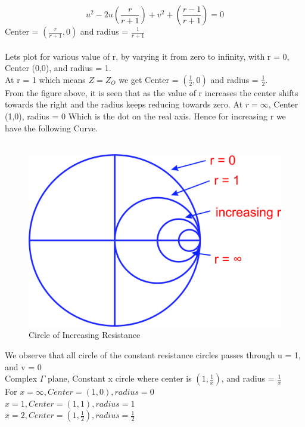 \begin{equation*}
u^2 - 2u\left(\frac{r}{r + 1}\right) + v^2 +\left(\frac{r - 1}{r + 1}\right) = 0
\end{equation*}
Center = $(\frac{r}{r + 1},0)$ and radius = $\frac{1}{r + 1}$\\\\
Lets plot for various value of r, by varying it from zero to infinity, with r = 0, Center (0,0), and radius = 1.\\
At r = 1 which means $Z = Z_O$ we get  Center = $(\frac{1}{2},0)$ and radius = $\frac{1}{2}$.\\
From the figure above, it is seen that as the value of r increases the center shifts towards the right and the radius keeps reducing towards zero. At $r = \infty$, Center (1,0), radius = 0 Which is the dot on the real axis. Hence for increasing r we have the following Curve.\\\\
\begin{figure}[h]
\centering
\includegraphics[width=0.5\linewidth]{./graphics/rghmgfcx}
\caption{Circle of Increasing Resistance}
\label{fig:rghmgfcx}
\end{figure}
We observe that all circle of the constant resistance circles passes through u = 1, and v = 0\\
Complex $\Gamma$ plane, Constant x circle where center is $(1,\frac{1}{x})$, and radius = $\frac{1}{x}$\\
For $x = \infty,Center = (1,0), radius = 0$\\
$x = 1,Center = (1,1), radius = 1$\\
$x = 2,Center = (1,\frac{1}{2}), radius = \frac{1}{2}$\\
